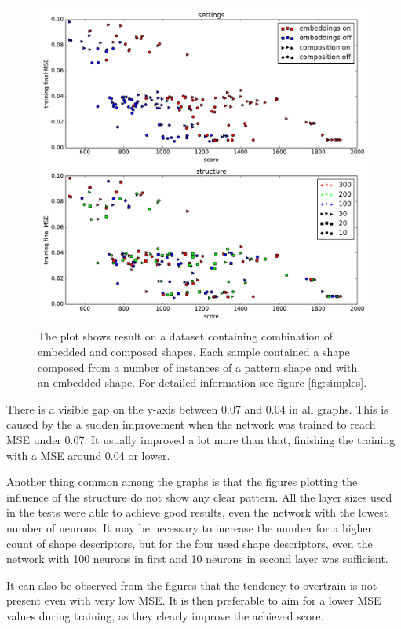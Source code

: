 \begin{figure}
\centering
\includegraphics[width=\linewidth]{ext/figure_x_cmb.pdf}
\caption{The plot shows result on a dataset containing combination of embedded and composed shapes. Each sample contained a shape composed from a number of instances of a pattern shape and with an embedded shape. For detailed information see figure \ref{fig:simples}.}
\label{fig:cmb}
\end{figure}

There is a visible gap on the y-axis between 0.07 and 0.04 in all graphs. This is caused by the a sudden improvement when the network was trained to reach MSE under 0.07. It usually improved a lot more than that, finishing the training with a MSE around 0.04 or lower.

Another thing common among the graphs is that the figures plotting the influence of the structure do not show any clear pattern. All the layer sizes used in the tests were able to achieve good results, even the network with the lowest number of neurons. It may be necessary to increase the number for a higher count of shape descriptors, but for the four used shape descriptors, even the network with 100 neurons in first and 10 neurons in second layer was sufficient.

It can also be observed from the figures that the tendency to overtrain is not present even with very low MSE. It is then preferable to aim for a lower MSE values during training, as they clearly improve the achieved score.

